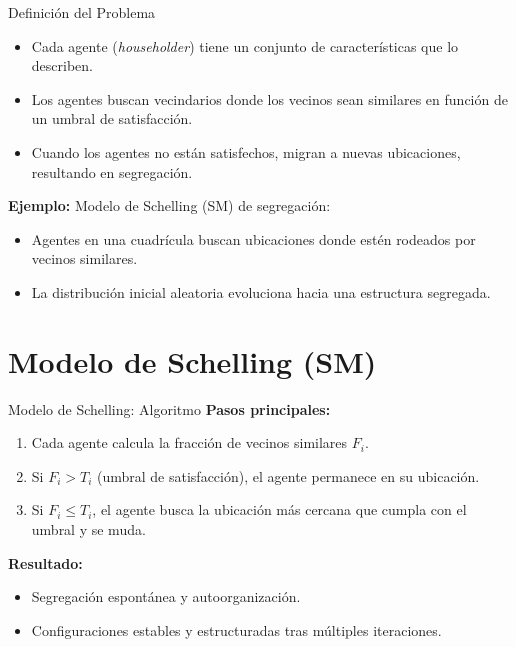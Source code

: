 \documentclass{beamer}
\begin{document}
\begin{frame}{Definición del Problema}
    \begin{itemize}
        \item Cada agente (\textit{householder}) tiene un conjunto de características que lo describen.
        \item Los agentes buscan vecindarios donde los vecinos sean similares en función de un umbral de satisfacción.
        \item Cuando los agentes no están satisfechos, migran a nuevas ubicaciones, resultando en segregación.
    \end{itemize}
    
    \textbf{Ejemplo:} Modelo de Schelling (SM) de segregación:
    \begin{itemize}
        \item Agentes en una cuadrícula buscan ubicaciones donde estén rodeados por vecinos similares.
        \item La distribución inicial aleatoria evoluciona hacia una estructura segregada.
    \end{itemize}
\end{frame}

\section{Modelo de Schelling (SM)}

\begin{frame}{Modelo de Schelling: Algoritmo}
    \textbf{Pasos principales:}
    \begin{enumerate}
        \item Cada agente calcula la fracción de vecinos similares \( F_i \).
        \item Si \( F_i > T_i \) (umbral de satisfacción), el agente permanece en su ubicación.
        \item Si \( F_i \leq T_i \), el agente busca la ubicación más cercana que cumpla con el umbral y se muda.
    \end{enumerate}
    \textbf{Resultado:} 
    \begin{itemize}
        \item Segregación espontánea y autoorganización.
        \item Configuraciones estables y estructuradas tras múltiples iteraciones.
    \end{itemize}
\end{frame}
\end{document}
